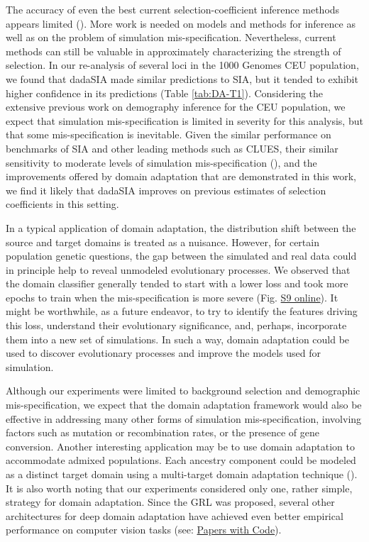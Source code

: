 The accuracy of even the best current selection-coefficient inference methods appears limited (\cite{flagel_unreasonable_2019,torada_imagene_2019,hejase_deep-learning_2022,stern_approximate_2019}). More work is needed on models and methods for inference as well as on the problem of simulation mis-specification. Nevertheless, current methods can still be valuable in approximately characterizing the strength of selection. In our re-analysis of several loci in the 1000 Genomes CEU population, we found that \ac{dadaSIA} made similar predictions to \ac{SIA}, but it tended to exhibit higher confidence in its predictions (Table \ref{tab:DA-T1}). Considering the extensive previous work on demography inference for the CEU population, we expect that simulation mis-specification is limited in severity for this analysis, but that some mis-specification is inevitable. Given the similar performance on benchmarks of \ac{SIA} and other leading methods such as CLUES, their similar sensitivity to moderate levels of simulation mis-specification (\cite{hejase_deep-learning_2022}), and the improvements offered by domain adaptation that are demonstrated in this work, we find it likely that \ac{dadaSIA} improves on previous estimates of selection coefficients in this setting.

In a typical application of domain adaptation, the distribution shift between the source and target domains is treated as a nuisance. However, for certain population genetic questions, the gap between the simulated and real data could in principle help to reveal unmodeled evolutionary processes. We observed that the domain classifier generally tended to start with a lower loss and took more epochs to train when the mis-specification is more severe (Fig. \href{https://journals.plos.org/plosgenetics/article?id=10.1371/journal.pgen.1011032#sec018}{S9 online}). It might be worthwhile, as a future endeavor, to try to identify the features driving this loss, understand their evolutionary significance, and, perhaps, incorporate them into a new set of simulations. In such a way, domain adaptation could be used to discover evolutionary processes and improve the models used for simulation.

Although our experiments were limited to background selection and demographic mis-specification, we expect that the domain adaptation framework would also be effective in addressing many other forms of simulation mis-specification, involving factors such as mutation or recombination rates, or the presence of gene conversion. Another interesting application may be to use domain adaptation to accommodate admixed populations. Each ancestry component could be modeled as a distinct target domain using a multi-target domain adaptation technique (\cite{isobe_multi-target_2021,nguyen-meidine_unsupervised_2021,roy_curriculum_2021}). It is also worth noting that our experiments considered only one, rather simple, strategy for domain adaptation. Since the \ac{GRL} was proposed, several other architectures for deep domain adaptation have achieved even better empirical performance on computer vision tasks (see: \href{https://paperswithcode.com/task/domain-adaptation}{Papers with Code}).


